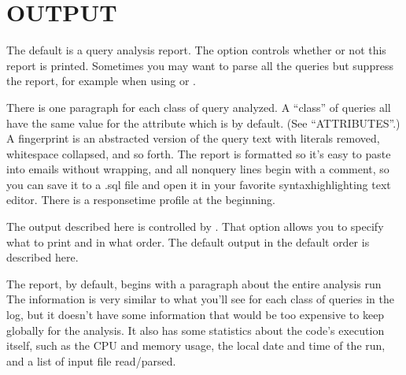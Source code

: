 \documentclass[letterpaper,10pt,english]{sphinxmanual}
\begin{document}
\section{OUTPUT}
\label{\detokenize{mariadb-query-digest:output}}
The default {\hyperref[\detokenize{mariadb-query-digest:cmdoption-mariadb-query-digest-output}]{}} is a query analysis report.  The {\hyperref[\detokenize{mariadb-query-digest:cmdoption-mariadb-query-digest-no-report}]{}}
option controls whether or not this report is printed.  Sometimes you may
want to parse all the queries but suppress the report, for example when using
{\hyperref[\detokenize{mariadb-query-digest:cmdoption-mariadb-query-digest-review}]{}} or {\hyperref[\detokenize{mariadb-query-digest:cmdoption-mariadb-query-digest-history}]{}}.

There is one paragraph for each class of query analyzed.  A “class” of queries
all have the same value for the {\hyperref[\detokenize{mariadb-query-digest:cmdoption-mariadb-query-digest-group-by}]{}} attribute which is
 by default.  (See “ATTRIBUTES”.)  A fingerprint is an
abstracted version of the query text with literals removed, whitespace
collapsed, and so forth.  The report is formatted so it’s easy to paste into
emails without wrapping, and all non\sphinxhyphen{}query lines begin with a comment, so you
can save it to a .sql file and open it in your favorite syntax\sphinxhyphen{}highlighting
text editor.  There is a response\sphinxhyphen{}time profile at the beginning.

The output described here is controlled by {\hyperref[\detokenize{mariadb-query-digest:cmdoption-mariadb-query-digest-report-format}]{}}.
That option allows you to specify what to print and in what order.
The default output in the default order is described here.

The report, by default, begins with a paragraph about the entire analysis run
The information is very similar to what you’ll see for each class of queries in
the log, but it doesn’t have some information that would be too expensive to
keep globally for the analysis.  It also has some statistics about the code’s
execution itself, such as the CPU and memory usage, the local date and time
of the run, and a list of input file read/parsed.
\end{document}
